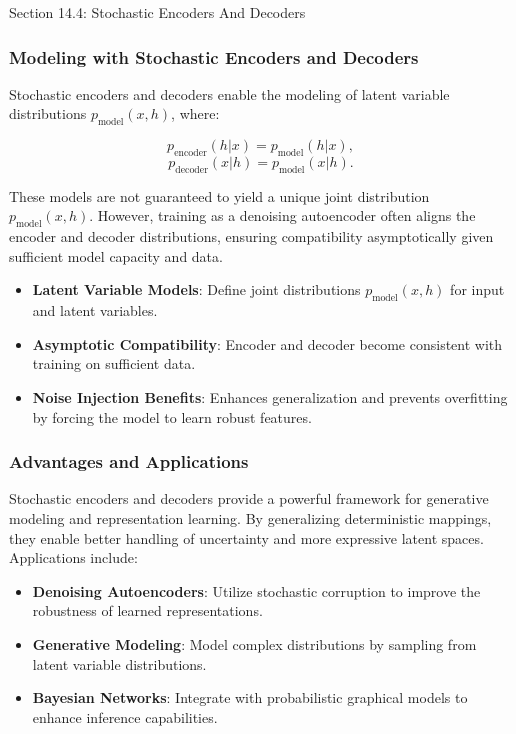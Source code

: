 \begin{notes}{Section 14.4: Stochastic Encoders And Decoders}
    \subsubsection*{Modeling with Stochastic Encoders and Decoders}
    
    Stochastic encoders and decoders enable the modeling of latent variable distributions $p_{\text{model}}(x, h)$, where:
    
    \[
    p_{\text{encoder}}(h|x) = p_{\text{model}}(h|x),
    \]
    \[
    p_{\text{decoder}}(x|h) = p_{\text{model}}(x|h).
    \]
    
    These models are not guaranteed to yield a unique joint distribution $p_{\text{model}}(x, h)$. However, training as a denoising autoencoder often aligns the encoder and decoder distributions, 
    ensuring compatibility asymptotically given sufficient model capacity and data.
    
    \begin{highlight}
        \begin{itemize}
            \item \textbf{Latent Variable Models}: Define joint distributions $p_{\text{model}}(x, h)$ for input and latent variables.
            \item \textbf{Asymptotic Compatibility}: Encoder and decoder become consistent with training on sufficient data.
            \item \textbf{Noise Injection Benefits}: Enhances generalization and prevents overfitting by forcing the model to learn robust features.
        \end{itemize}
    \end{highlight}
    
    \subsubsection*{Advantages and Applications}
    
    Stochastic encoders and decoders provide a powerful framework for generative modeling and representation learning. By generalizing deterministic mappings, they enable better handling of uncertainty 
    and more expressive latent spaces. Applications include:
    \begin{itemize}
        \item \textbf{Denoising Autoencoders}: Utilize stochastic corruption to improve the robustness of learned representations.
        \item \textbf{Generative Modeling}: Model complex distributions by sampling from latent variable distributions.
        \item \textbf{Bayesian Networks}: Integrate with probabilistic graphical models to enhance inference capabilities.
    \end{itemize}
    

\end{notes}
